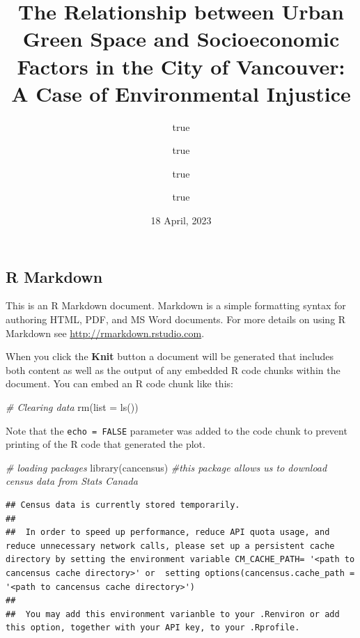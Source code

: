 \documentclass[
]{article}
\title{The Relationship between Urban Green Space and Socioeconomic
Factors in the City of Vancouver: A Case of Environmental Injustice}
\author{true \and true \and true \and true}
\date{18 April, 2023}
\newenvironment{Shaded}{\begin{snugshade}}{\end{snugshade}}
\newcommand{\AttributeTok}[1]{\textcolor[rgb]{0.77,0.63,0.00}{#1}}
\newcommand{\CommentTok}[1]{\textcolor[rgb]{0.56,0.35,0.01}{\textit{#1}}}
\newcommand{\FunctionTok}[1]{\textcolor[rgb]{0.00,0.00,0.00}{#1}}
\newcommand{\NormalTok}[1]{#1}
\begin{document}
\maketitle

\hypertarget{r-markdown}{%
\subsection{R Markdown}\label{r-markdown}}

This is an R Markdown document. Markdown is a simple formatting syntax
for authoring HTML, PDF, and MS Word documents. For more details on
using R Markdown see \url{http://rmarkdown.rstudio.com}.

When you click the \textbf{Knit} button a document will be generated
that includes both content as well as the output of any embedded R code
chunks within the document. You can embed an R code chunk like this:

\begin{Shaded}
\begin{Highlighting}[]
\CommentTok{\# Clearing data}
\FunctionTok{rm}\NormalTok{(}\AttributeTok{list =} \FunctionTok{ls}\NormalTok{())}
\end{Highlighting}
\end{Shaded}

Note that the \texttt{echo\ =\ FALSE} parameter was added to the code
chunk to prevent printing of the R code that generated the plot.

\begin{Shaded}
\begin{Highlighting}[]
\CommentTok{\# loading packages}
\FunctionTok{library}\NormalTok{(cancensus) }\CommentTok{\#this package allows us to download census data from Stats Canada}
\end{Highlighting}
\end{Shaded}

\begin{verbatim}
## Census data is currently stored temporarily.
## 
##  In order to speed up performance, reduce API quota usage, and reduce unnecessary network calls, please set up a persistent cache directory by setting the environment variable CM_CACHE_PATH= '<path to cancensus cache directory>' or  setting options(cancensus.cache_path = '<path to cancensus cache directory>')
## 
##  You may add this environment varianble to your .Renviron or add this option, together with your API key, to your .Rprofile.
\end{verbatim}
\end{document}
